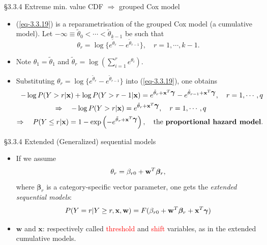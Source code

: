 \documentclass{beamer}
\newcommand{\boldbeta}{{\boldsymbol \beta}}
\newenvironment{wideitemize}%
  {\begin{itemize}%
    \setlength{\parskip}{1em}}%
  {\end{itemize}}
\begin{document}
\begin{frame}{\S3.3.4 Extreme min. value CDF $\Rightarrow$ grouped Cox model}
\begin{itemize}
\item

(\ref{eq-3.3.19}) is a reparametrisation  of the grouped Cox model (a cumulative model). Let $-\infty \equiv \tilde{\theta}_0 < \cdots < \tilde{\theta}_{k-1}$ be such that
$$\theta_r=\log\{e^{\tilde{\theta}_r}-e^{\tilde{\theta}_{r-1}}\}, \quad r=1,\cdots, k-1.$$

\item Note $\theta_1=\tilde{\theta}_1$ and $\displaystyle \tilde{\theta}_r=\log\left(\sum_{i=1}^r e^{\theta_i}\right)$.

\item 
Substituting  $\theta_r=\log\{e^{\tilde{\theta}_r}-e^{\tilde{\theta}_{r-1}}\}$ into (\ref{eq-3.3.19}),
one obtains {\footnotesize
\begin{eqnarray*}
-\log P(Y>r|\textbf{x})+ \log P(Y> r-1|\textbf{x})=e^{\tilde{\theta}_r+\textbf{x}^T\mbox{\boldmath $\gamma$}}
-e^{\tilde{\theta}_{r-1}+\textbf{x}^T\mbox{\boldmath $\gamma$}}, \quad r=1,\cdots,q \\
 \Rightarrow \quad -\log P(Y>r|\textbf{x})=e^{\tilde{\theta}_r+\textbf{x}^T\mbox{\boldmath $\gamma$}},
\quad r=1,\cdots,q \hspace{80pt} \\
 \Rightarrow \quad P(Y\leq r|\textbf{x})=1-\exp\left(-e^{\tilde{\theta}_r+\textbf{x}^T\mbox{\boldmath $\gamma$}}\right),
\quad \mbox{\normalsize  the \textbf{proportional hazard model}.}
\end{eqnarray*}}
\end{itemize}
\end{frame}

\begin{frame}{\S3.3.4 Extended (Generalized) sequential models}

\begin{wideitemize}

\item 

If we assume
\[
\theta_r=\beta_{r0}+{\bf w}^T\boldbeta_r,
\]
 where 
${\boldsymbol \beta}_r$ is a category-specific vector
parameter, one gets the \textit{extended sequential models}:
\begin{equation*}
P(Y=r|Y\geq r,\textbf{x}, \textbf{w})=F(\beta_{r0}+\textbf{w}^T\boldbeta_r+ 
\textbf{x}^T\mbox{\boldmath $\gamma$})
\label{eq-3.3.20}
\end{equation*}
\item $\textbf{w}$ and $\textbf{x}$: respectively called \textcolor{red}{threshold} and \textcolor{red}{shift} variables, as in the extended cumulative models. 


\end{wideitemize}
\end{frame}
\end{document}
